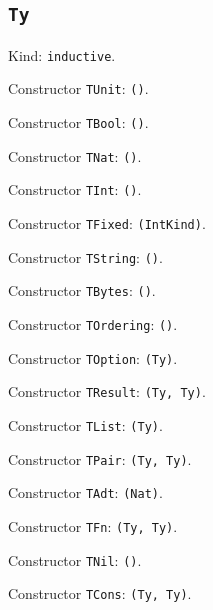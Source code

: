 \documentclass[11pt]{article}
\begin{document}
\subsection*{\texttt{Ty}}
\noindent Kind: \texttt{inductive}.\par
\noindent Constructor \texttt{TUnit}: \texttt{()}.\par
\noindent Constructor \texttt{TBool}: \texttt{()}.\par
\noindent Constructor \texttt{TNat}: \texttt{()}.\par
\noindent Constructor \texttt{TInt}: \texttt{()}.\par
\noindent Constructor \texttt{TFixed}: \texttt{(IntKind)}.\par
\noindent Constructor \texttt{TString}: \texttt{()}.\par
\noindent Constructor \texttt{TBytes}: \texttt{()}.\par
\noindent Constructor \texttt{TOrdering}: \texttt{()}.\par
\noindent Constructor \texttt{TOption}: \texttt{(Ty)}.\par
\noindent Constructor \texttt{TResult}: \texttt{(Ty, Ty)}.\par
\noindent Constructor \texttt{TList}: \texttt{(Ty)}.\par
\noindent Constructor \texttt{TPair}: \texttt{(Ty, Ty)}.\par
\noindent Constructor \texttt{TAdt}: \texttt{(Nat)}.\par
\noindent Constructor \texttt{TFn}: \texttt{(Ty, Ty)}.\par
\noindent Constructor \texttt{TNil}: \texttt{()}.\par
\noindent Constructor \texttt{TCons}: \texttt{(Ty, Ty)}.\par
\end{document}
